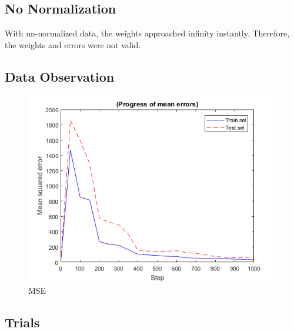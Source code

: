 \documentclass[12pt, letterpaper]{report}
\begin{document}
\subsection{No Normalization}

With un-normalized data, the weights approached infinity instantly.  Therefore, the weights and errors were not valid.

\subsection{Data Observation}

\begin{figure}[H]
	\centering
	\includegraphics[width=0.7\columnwidth]{p3d.png}
	\caption{MSE}
\end{figure}

\subsection{Trials}
\end{document}

